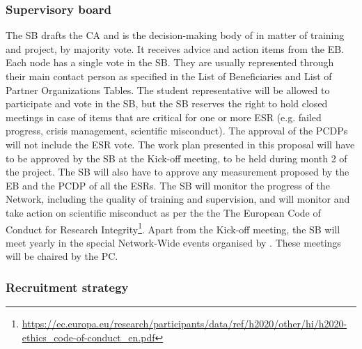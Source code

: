 \vspace{-2mm}
\subsubsection{Supervisory board}


The SB drafts the CA and is the decision-making body of \acronym in matter of training and project, by majority vote. 
It receives advice and action items from the EB. 
Each \acronym node has a single vote in the SB. They are usually represented through their main contact person as specified in the List of Beneficiaries and List of Partner Organizations Tables.
The student representative will be allowed to participate and vote in the SB, but the SB reserves the right to hold closed meetings in case of items that are critical for one or more ESR (e.g. failed progress, crisis management, scientific misconduct). 
The approval of the PCDPs will not include the ESR vote.
The work plan presented in this proposal will have to be approved by the SB at the Kick-off meeting, to be held during month 2 of the project. 
The SB will also have to approve any measurement proposed by the EB and the PCDP of all the ESRs.
The SB will monitor the progress of the Network, including the quality of training and supervision, and will monitor and take action on scientific misconduct as per the the The European Code of Conduct for Research Integrity\footnote{\url{https://ec.europa.eu/research/participants/data/ref/h2020/other/hi/h2020-ethics_code-of-conduct_en.pdf}}. 
Apart from the Kick-off meeting, the SB will meet yearly in the special Network-Wide events organised by \acronym. 
These meetings will be chaired by the PC.

\vspace{-2mm}
\subsubsection{Recruitment strategy}

